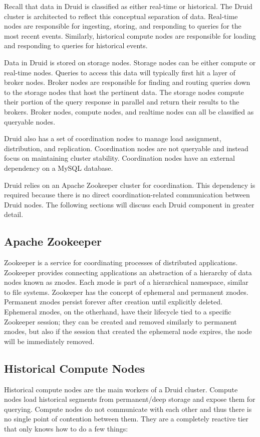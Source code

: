 \documentclass{vldb}
\begin{document}
Recall that data in Druid is classified as either real-time or historical. The Druid cluster is architected to reflect this conceptual separation of data. Real-time nodes are responsible for ingesting, storing, and responding to queries for the most recent events. Similarly, historical compute nodes are responsible for loading and responding to queries for historical events.

Data in Druid is stored on storage nodes. Storage nodes can be either compute or real-time nodes.  Queries to access this data will typically first hit a layer of broker nodes. Broker nodes are responsible for finding and routing queries down to the storage nodes that host the pertinent data. The storage nodes compute their portion of the query response in parallel and return their results to the brokers. Broker nodes, compute nodes, and realtime nodes can all be classified as queryable nodes.

Druid also has a set of coordination nodes to manage load assignment, distribution, and replication. Coordination nodes are not queryable and instead focus on maintaining cluster stability. Coordination nodes have an external dependency on a MySQL database.

Druid relies on an Apache Zookeeper \cite{hunt2010zookeeper} cluster for coordination. This dependency is required because there is no direct coordination-related communication between Druid nodes. The following sections will discuss each Druid component in greater detail.

\subsection{Apache Zookeeper}
Zookeeper is a service for coordinating processes of distributed applications. Zookeeper provides connecting applications an abstraction of a hierarchy of data nodes known as znodes. Each znode is part of a hierarchical namespace, similar to file systems. Zookeeper has the concept of ephemeral and permanent znodes. Permanent znodes persist forever after creation until explicitly deleted. Ephemeral znodes, on the otherhand, have their lifecycle tied to a specific Zookeeper session; they can be created and removed similarly to permanent znodes, but also if the session that created the ephemeral node expires, the node will be immediately removed.

\subsection{Historical Compute Nodes}
Historical compute nodes are the main workers of a Druid cluster.  Compute nodes load historical segments from permanent/deep storage and expose them for querying. Compute nodes do not communicate with each other and thus there is no single point of contention between them.  They are a completely reactive tier that only knows how to do a few things:
\end{document}
